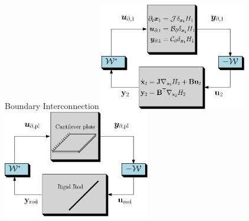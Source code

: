 \documentclass[aspectratio=169]{ISAE-Beamer}
\begin{document}
\begin{frame}{Boundary Interconnection}
\centering 
\includegraphics[width=0.48\textwidth]{part_4/validation/KP/pp_interconnection.eps}
\hspace{5pt}
\includegraphics[width=0.48\textwidth]{presentation/pp_interconnection_platerod.eps}
\end{frame}
\end{document}
